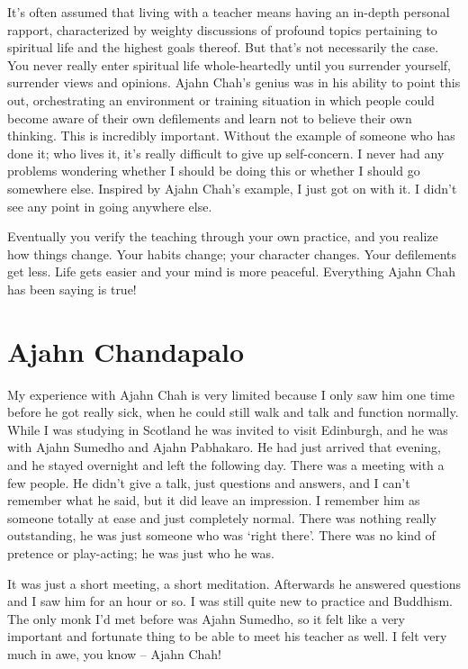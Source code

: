 It's often assumed that living with a teacher means having an in-depth
personal rapport, characterized by weighty discussions of profound
topics pertaining to spiritual life and the highest goals thereof. But
that's not necessarily the case. You never really enter spiritual life
whole-heartedly until you surrender yourself, surrender views and
opinions. Ajahn Chah's genius was in his ability to point this out,
orchestrating an environment or training situation in which people could
become aware of their own defilements and learn not to believe their own
thinking. This is incredibly important. Without the example of someone
who has done it; who lives it, it's really difficult to give up
self-concern. I never had any problems wondering whether I should be
doing this or whether I should go somewhere else. Inspired by Ajahn
Chah's example, I just got on with it. I didn't see any point in going
anywhere else.

Eventually you verify the teaching through your own practice, and you
realize how things change. Your habits change; your character changes.
Your defilements get less. Life gets easier and your mind is more
peaceful. Everything Ajahn Chah has been saying is true!

\section{Ajahn Chandapalo}

My experience with Ajahn Chah is very limited because I only saw him one
time before he got really sick, when he could still walk and talk and
function normally. While I was studying in Scotland he was invited to
visit Edinburgh, and he was with Ajahn Sumedho and Ajahn Pabhakaro. He
had just arrived that evening, and he stayed overnight and left the
following day. There was a meeting with a few people. He didn't give a
talk, just questions and answers, and I can't remember what he said, but
it did leave an impression. I remember him as someone totally at ease
and just completely normal. There was nothing really outstanding, he was
just someone who was `right there'. There was no kind of pretence or
play-acting; he was just who he was.

It was just a short meeting, a short meditation. Afterwards he answered
questions and I saw him for an hour or so. I was still quite new to
practice and Buddhism. The only monk I'd met before was Ajahn Sumedho,
so it felt like a very important and fortunate thing to be able to meet
his teacher as well. I felt very much in awe, you know -- Ajahn Chah!

